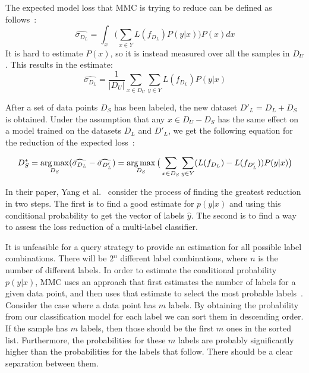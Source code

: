 The expected model loss that MMC is trying to reduce can be defined as follows~\cite{yang2009effective}:
\begin{equation}
    \widehat{\sigma_{D_L}} = \int_x \bigg ( \sum_{x \in Y} L(f_{D_L})P(y|x) \bigg ) P(x)dx
\end{equation}
It is hard to estimate $P(x)$, so it is instead measured over all the samples in $D_U$.
This results in the estimate:
\begin{equation}
    \widehat{\sigma_{D_L}} = \frac{1}{|D_U|} \sum_{x \in D_U} \sum_{y \in Y} L(f_{D_L})P(y|x)
\end{equation}

After a set of data points $D_S$ has been labeled, the new dataset $D'_L=D_L + D_S$ is obtained.
Under the assumption that any $x \in D_U - D_S$ has the same effect on a model trained on the datasets $D_L$ and $D'_L$, we get the following equation for the reduction of the expected loss~\cite{yang2009effective}:

\begin{equation}
    D^*_S = \operatorname*{arg\,max}_{D_S}(\widehat{\sigma_{D_L}} - \widehat{\sigma_{D'_L}}) = \operatorname*{arg\,max}_{D_S} \big ( \sum_{x \in D_S} \sum_{y \in Y} (L(f_{D_L}) - L(f_{D'_L})) P(y|x) \big )
\end{equation}

In their paper, Yang et al\@.~\cite{yang2009effective} consider the process of finding the greatest reduction in two steps. 
The first is to find a good estimate for $p(y|x)$ and using this conditional probability to get the vector of labels $\hat{y}$. 
The second is to find a way to assess the loss reduction of a multi-label classifier.

It is unfeasible for a query strategy to provide an estimation for all possible label combinations.
There will be $2^n$ different label combinations, where $n$ is the number of different labels.
In order to estimate the conditional probability $p(y|x)$, MMC uses an approach that first estimates the number of labels for a given data point, and then uses that estimate to select the most probable labels~\cite{yang2009effective}.
Consider the case where a data point has $m$ labels.
By obtaining the probability from our classification model for each label we can sort them in descending order.
If the sample has $m$ labels, then those should be the first $m$ ones in the sorted list.
Furthermore, the probabilities for these $m$ labels are probably significantly higher than the probabilities for the labels that follow.
There should be a clear separation between them.

